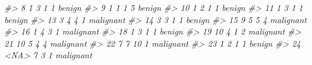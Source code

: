 \documentclass[]{book}
\newenvironment{Shaded}{\begin{snugshade}}{\end{snugshade}}
\newcommand{\CommentTok}[1]{\textcolor[rgb]{0.56,0.35,0.01}{\textit{#1}}}
\begin{document}
\begin{Shaded}
\begin{Highlighting}[]
\CommentTok{#> 8            1           3               1       1    benign}
\CommentTok{#> 9            1           1               1       5    benign}
\CommentTok{#> 10           1           2               1       1    benign}
\CommentTok{#> 11           1           3               1       1    benign}
\CommentTok{#> 13           3           4               4       1 malignant}
\CommentTok{#> 14           3           3               1       1    benign}
\CommentTok{#> 15           9           5               5       4 malignant}
\CommentTok{#> 16           1           4               3       1 malignant}
\CommentTok{#> 18           1           3               1       1    benign}
\CommentTok{#> 19          10           4               1       2 malignant}
\CommentTok{#> 21          10           5               4       4 malignant}
\CommentTok{#> 22           7           7              10       1 malignant}
\CommentTok{#> 23           1           2               1       1    benign}
\CommentTok{#> 24        <NA>           7               3       1 malignant}
\end{Highlighting}
\end{Shaded}
\end{document}
